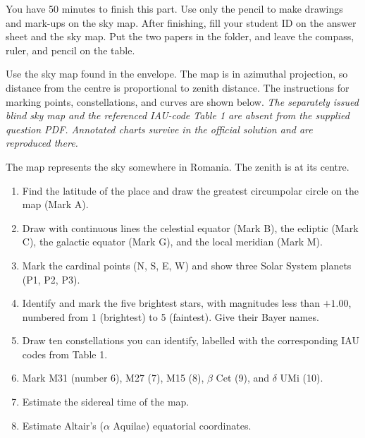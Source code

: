 You have 50 minutes to finish this part. Use only the pencil to make drawings
and mark-ups on the sky map. After finishing, fill your student ID on the
answer sheet and the sky map. Put the two papers in the folder, and leave
the compass, ruler, and pencil on the table.

Use the sky map found in the envelope. The map is in azimuthal projection,
so distance from the centre is proportional to zenith distance. The
instructions for marking points, constellations, and curves are shown below.
\textit{The separately issued blind sky map and the referenced IAU-code
Table 1 are absent from the supplied question PDF. Annotated charts survive
in the official solution and are reproduced there.}

The map represents the sky somewhere in Romania. The zenith is at its centre.
\begin{enumerate}
\item Find the latitude of the place and draw the greatest circumpolar circle
  on the map (Mark A).
\item Draw with continuous lines the celestial equator (Mark B), the ecliptic
  (Mark C), the galactic equator (Mark G), and the local meridian (Mark M).
\item Mark the cardinal points (N, S, E, W) and show three Solar System
  planets (P1, P2, P3).
\item Identify and mark the five brightest stars, with magnitudes less than
  $+1.00$, numbered from 1 (brightest) to 5 (faintest). Give their Bayer names.
\item Draw ten constellations you can identify, labelled with the corresponding
  IAU codes from Table 1.
\item Mark M31 (number 6), M27 (7), M15 (8), $\beta$ Cet (9), and $\delta$ UMi (10).
\item Estimate the sidereal time of the map.
\item Estimate Altair's ($\alpha$ Aquilae) equatorial coordinates.
\end{enumerate}
